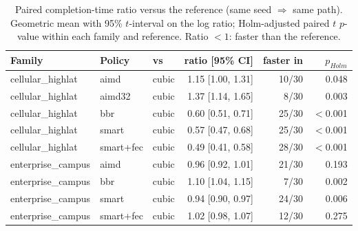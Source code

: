 \begin{table}[t]\centering\footnotesize
\caption{Paired completion-time ratio versus the reference (same seed $\Rightarrow$ same path). Geometric mean with 95\% $t$-interval on the log ratio; Holm-adjusted paired $t$ $p$-value within each family and reference. Ratio $<1$: faster than the reference.}
\label{tab:scalepaired}\begin{tabular}{lllrrr}\toprule
Family & Policy & vs & ratio [95\% CI] & faster in & $p_{Holm}$\\\midrule
cellular\_highlat & aimd & cubic & 1.15 [1.00, 1.31] & 10/30 & 0.048 \\
cellular\_highlat & aimd32 & cubic & 1.37 [1.14, 1.65] & 8/30 & 0.003 \\
cellular\_highlat & bbr & cubic & 0.60 [0.51, 0.71] & 25/30 & $<$0.001 \\
cellular\_highlat & smart & cubic & 0.57 [0.47, 0.68] & 25/30 & $<$0.001 \\
cellular\_highlat & smart+fec & cubic & 0.49 [0.41, 0.58] & 28/30 & $<$0.001 \\
enterprise\_campus & aimd & cubic & 0.96 [0.92, 1.01] & 21/30 & 0.193 \\
enterprise\_campus & bbr & cubic & 1.10 [1.04, 1.15] & 7/30 & 0.002 \\
enterprise\_campus & smart & cubic & 0.94 [0.90, 0.97] & 24/30 & 0.006 \\
enterprise\_campus & smart+fec & cubic & 1.02 [0.98, 1.07] & 12/30 & 0.275 \\
\bottomrule\end{tabular}\end{table}
